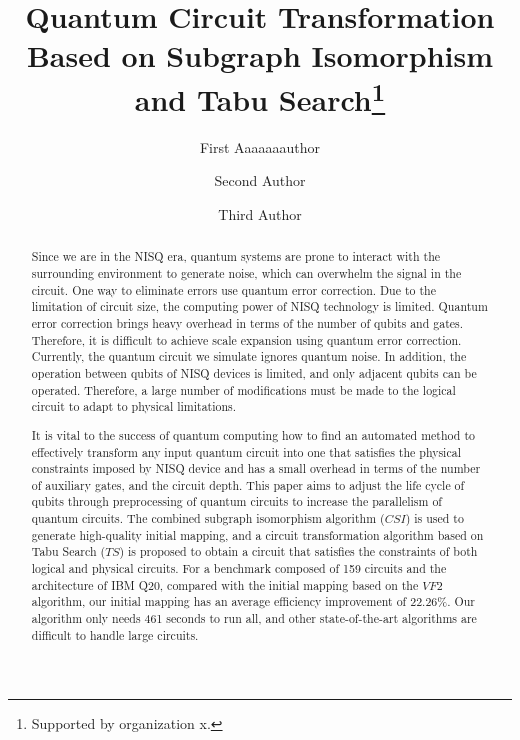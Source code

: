 \documentclass[runningheads]{llncs}
\begin{document}
%
\title{Quantum Circuit Transformation Based on Subgraph Isomorphism and Tabu Search\thanks{Supported by organization x.}}
%
%
\author{First Aaaaaaauthor \and
Second Author \and
Third Author}
%
%
%
\maketitle              %
%
\begin{abstract}
	Since we are in the NISQ era, quantum systems are prone to interact with the surrounding environment 
	to generate noise, which can overwhelm the signal in the circuit. 
	One way to eliminate errors  use quantum error correction. 
	Due to the limitation of circuit size, the computing power of NISQ technology is limited. 
	Quantum error correction brings heavy overhead in terms of the number of qubits and gates. 
	Therefore, it is difficult to achieve scale expansion using quantum error correction. 
	Currently, the quantum circuit we simulate ignores quantum noise. 
	In addition, the operation between qubits of NISQ devices is limited, 
	and only adjacent qubits can be operated. Therefore, a large number of modifications must 
	be made to the logical circuit to adapt to physical limitations. 


	It is vital to the success of quantum computing 
	how to find an automated method to effectively transform any input quantum circuit into 
	one that satisfies the physical constraints imposed by NISQ device 
	and has a small overhead in terms of the number of auxiliary gates, and the circuit depth.
	This paper aims to adjust the life cycle of qubits through preprocessing of quantum circuits 
	to increase the parallelism of quantum circuits.
	The combined subgraph isomorphism algorithm ($CSI$) is used to generate high-quality initial mapping, 
	and a circuit transformation algorithm based on Tabu Search ($TS$) is proposed to obtain a circuit 
	that satisfies the constraints of both logical and physical circuits.
	 For a benchmark composed of 159 circuits and the architecture of IBM Q20,
	  compared with the initial mapping based on the $VF2$ algorithm, 
	  our initial mapping has an average efficiency improvement of 22.26\%. 
	  Our algorithm only needs 461 seconds to run all, 
	  and other state-of-the-art algorithms are difficult to handle large circuits.
\end{abstract}
\end{document}
